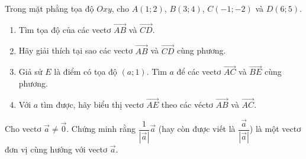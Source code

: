 \begin{bt}%
	Trong mặt phẳng tọa độ $Oxy$, cho $A(1;2)$, $B(3;4)$, $C(-1;-2)$ và $D(6;5)$.

		\begin{enumerate}
			\item Tìm tọa độ của các vectơ $\overrightarrow{AB}$ và $\overrightarrow{CD}$.
			\item Hãy giải thích tại sao các vectơ $\overrightarrow{AB}$ và $\overrightarrow{CD}$ cùng phương.
			\item Giả sử $E$ là điểm có tọa độ $(a;1)$. Tìm $a$ để các vectơ $\overrightarrow{AC}$ và $\overrightarrow{BE}$ cùng phương.
			\item  Với $a$ tìm được, hãy biểu thị vectơ $\overrightarrow{AE}$ theo các véctơ $\overrightarrow{AB}$ và $\overrightarrow{AC}$.
		\end{enumerate}

\end{bt}
\begin{bt}%
	Cho vectơ $\overrightarrow{a}\ne \overrightarrow{0}$. Chứng minh rằng $\dfrac{1}{\left|\overrightarrow{a}\right|}\overrightarrow{a}$ (hay còn được viết là $\dfrac{\overrightarrow{a}}{\left|\overrightarrow{a}\right|}$) là một vectơ đơn vị cùng hướng với vectơ $\overrightarrow{a}$.
\end{bt}

